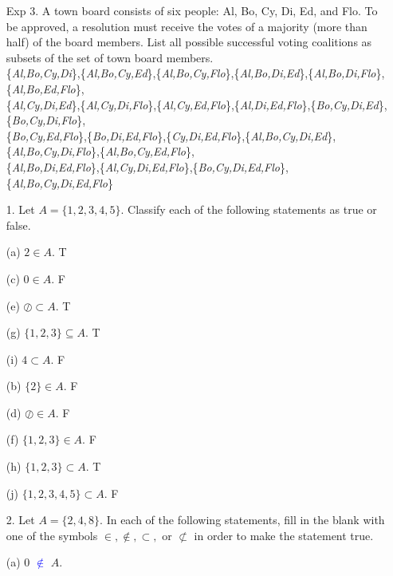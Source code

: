 \documentclass{article}
\begin{document}
\begin{itemize}
    \item[Exp 3.] A town board consists of six people: Al, Bo, Cy, Di, Ed, and Flo.  To be approved, a resolution must receive the votes of a majority (more than half) of the board members.  List all possible successful voting coalitions as subsets of the set of town board members.\\
    {\color{blue}  \{\emph{Al,Bo,Cy,Di}\},\{\emph{Al,Bo,Cy,Ed}\},\{\emph{Al,Bo,Cy,Flo}\},\{\emph{Al,Bo,Di,Ed}\},\{\emph{Al,Bo,Di,Flo}\},\{\emph{Al,Bo,Ed,Flo}\},\\\{\emph{Al,Cy,Di,Ed}\},\{\emph{Al,Cy,Di,Flo}\},\{\emph{Al,Cy,Ed,Flo}\},\{\emph{Al,Di,Ed,Flo}\},\{\emph{Bo,Cy,Di,Ed}\},\{\emph{Bo,Cy,Di,Flo}\},\\\{\emph{Bo,Cy,Ed,Flo}\},\{\emph{Bo,Di,Ed,Flo}\},\{\emph{Cy,Di,Ed,Flo}\},\{\emph{Al,Bo,Cy,Di,Ed}\},\{\emph{Al,Bo,Cy,Di,Flo}\},\{\emph{Al,Bo,Cy,Ed,Flo}\},\\\{\emph{Al,Bo,Di,Ed,Flo}\},\{\emph{Al,Cy,Di,Ed,Flo}\},\{\emph{Bo,Cy,Di,Ed,Flo}\},\{\emph{Al,Bo,Cy,Di,Ed,Flo}\}}
    
    \item[1.] Let $A = \{1, 2, 3, 4, 5\}$. Classify each of the following statements as true or false.
        \begin{multicols}{2}
        (a) $2 \in A.$ {\color{blue} T}
        
        (c) $0 \in A.$ {\color{blue} F}
        
        (e) $\oslash \subset A.$ {\color{blue} T}
        
        (g) $\{1,2,3\} \subseteq A.$ {\color{blue} T}
        
        (i) $4 \subset A.$ {\color{blue} F}
        
        \columnbreak
        (b) $\{2\} \in A.$ {\color{blue} F}
        
        (d) $\oslash \in A.$ {\color{blue} F}
        
        (f) $\{1,2,3\} \in A.$ {\color{blue} F}
        
        (h) $\{1,2,3\} \subset A.$ {\color{blue} T}
        
        (j) $\{1,2,3,4,5\} \subset A.$ {\color{blue} F}
        
        \end{multicols}
        
    \item[2.] Let $A = \{2,4,8\}$. In each of the following statements, fill in the blank with one of the symbols $\in, \notin, \subset,$ or $\not\subset$ in order to make the statement true.
        \begin{multicols}{2}
        (a) 0 \textcolor{blue}{$\notin$} $A$.
        

\end{multicols}
\end{itemize}
\end{document}
